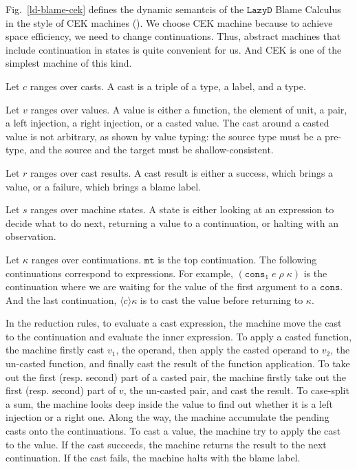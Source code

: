 \documentclass[acmsmall,review,anonymous]{acmart}\settopmatter{printfolios=true,printccs=false,printacmref=false}
\newcommand{\lazyD}{$\mathtt{Lazy D}$}
\begin{document}
Fig.~\ref{ld-blame-cek} defines the dynamic semantcis of the \lazyD{} Blame 
Calculus in the style of CEK machines (\citet{felleisen1986control}). 
We choose CEK machine because to achieve space efficiency, we need to change 
continuations. Thus, abstract machines that include continuation in states is 
quite convenient for us. And CEK is one of the simplest machine of this kind.

Let $ c $ ranges over casts. A cast is a triple of a type, a label, and a type.

Let $ v $ ranges over values. A value is either a function, the 
element of unit, a pair, a left injection, a right injection, or a casted value.
The cast around a casted value is not arbitrary, as shown by value typing: the 
source type must be a pre-type, and the source and the target must be 
shallow-consistent.

Let $ r $ ranges over cast results. A cast result is either a success, which 
brings a value, or a failure, which brings a blame label.

Let $ s $ ranges over machine states. A state is either looking at an 
expression to decide what to do next, returning a value to a continuation, or 
halting with an observation.

Let $ \kappa $ ranges over continuations. $ \mathtt{mt} $ is the top 
continuation. The following continuations correspond to expressions. For 
example, $ (\mathtt{cons_1} \; e \; \rho \; \kappa) $ is the continuation where 
we are waiting for the value of the first argument to a $ \mathtt{cons} $. And 
the last continuation, $ \langle c \rangle \kappa $ is to cast the value before 
returning to $ \kappa $.

In the reduction rules, to evaluate a cast expression, the machine move the 
cast to the continuation and evaluate the inner expression. To apply a casted 
function, the machine firstly cast $ v_1 $, the operand, then apply the casted 
operand to $ v_2 $, the un-casted function, and finally cast the result of the 
function application. To take out the first (resp. second) part of a casted 
pair, the machine firstly take out the first (resp. second) part of $ v $, the 
un-casted pair, and cast the result. To case-split a sum, the machine looks 
deep inside the value to find out whether it is a left injection or a right 
one. Along the way, the machine accumulate the pending casts onto the 
continuations. To cast a value, the machine try to apply the cast to the value. 
If the cast succeeds, the machine returns the result to the next continuation. 
If the cast fails, the machine halts with the blame label.
\end{document}
